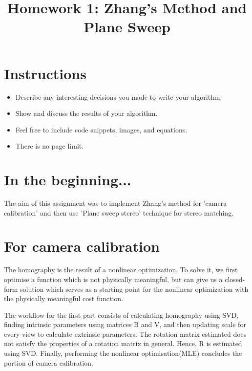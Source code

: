 \title{\vspace{-1cm}Homework 1: Zhang's Method and Plane Sweep}



\maketitle
\vspace{-3cm}
\thispagestyle{fancy}

\section*{Instructions}
\begin{itemize}
  \item Describe any interesting decisions you made to write your algorithm.
  \item Show and discuss the results of your algorithm.
  \item Feel free to include code snippets, images, and equations.
  \item There is no page limit.
  
\end{itemize}

\section{In the beginning...}

The aim of this assignment was to implement Zhang's method for 'camera calibration' and then use 'Plane sweep stereo' technique for stereo matching. 

\section{For camera calibration}

The homography is the result of a nonlinear optimization. To solve it, we first optimise a function which is not physically meaningful, but can give us a closed-form solution which serves as a starting point for the nonlinear optimization with the physically meaningful cost function.

 The workflow for the first part consists of calculating homography using SVD, finding intrinsic parameters using matrices B and V, and then updating scale for every view to calculate extrinsic parameters. The rotation matrix estimated does not satisfy the properties of a rotation matrix in general. Hence, R is estimated using SVD. Finally, performing the nonlinear optimisation(MLE) concludes the portion of camera calibration.


